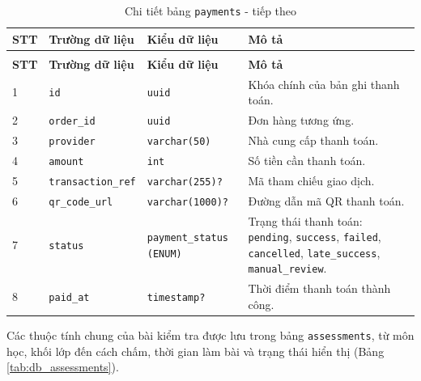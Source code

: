 \documentclass[../DoAn.tex]{subfiles}
\begin{document}
{\begin{longtable}{|p{}|p{}|p{}|p{}|}
\caption{Chi tiết bảng \texttt{payments}}
\label{tab:db_payments}\\
\hline
\textbf{STT} & \textbf{Trường dữ liệu} & \textbf{Kiểu dữ liệu} & \textbf{Mô tả} \\ \hline
\endfirsthead
\caption[]{Chi tiết bảng \texttt{payments} - tiếp theo}\\
\hline
\textbf{STT} & \textbf{Trường dữ liệu} & \textbf{Kiểu dữ liệu} & \textbf{Mô tả} \\ \hline
\endhead
1 & \texttt{id} & \texttt{uuid} & Khóa chính của bản ghi thanh toán. \\ \hline
2 & \texttt{order\_id} & \texttt{uuid} & Đơn hàng tương ứng. \\ \hline
3 & \texttt{provider} & \texttt{varchar(50)} & Nhà cung cấp thanh toán. \\ \hline
4 & \texttt{amount} & \texttt{int} & Số tiền cần thanh toán. \\ \hline
5 & \texttt{transaction\_ref} & \texttt{varchar(255)?} & Mã tham chiếu giao dịch. \\ \hline
6 & \texttt{qr\_code\_url} & \texttt{varchar(1000)?} & Đường dẫn mã QR thanh toán. \\ \hline
7 & \texttt{status} & \texttt{payment\_status (ENUM)} & Trạng thái thanh toán: \texttt{pending}, \texttt{success}, \texttt{failed}, \texttt{cancelled}, \texttt{late\_success}, \texttt{manual\_review}. \\ \hline
8 & \texttt{paid\_at} & \texttt{timestamp?} & Thời điểm thanh toán thành công. \\ \hline
\end{longtable}

Các thuộc tính chung của bài kiểm tra được lưu trong bảng \texttt{assessments}, từ môn học, khối lớp đến cách chấm, thời gian làm bài và trạng thái hiển thị (Bảng \ref{tab:db_assessments}).

}
\end{document}
